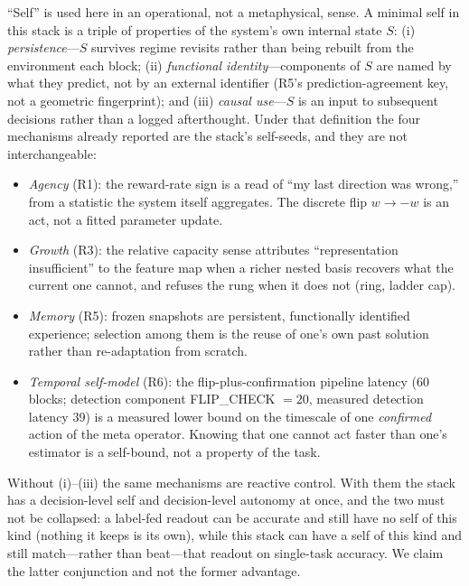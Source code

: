 \documentclass[preprint,12pt]{elsarticle}
\begin{document}
``Self'' is used here in an operational, not a metaphysical, sense. A minimal
self in this stack is a triple of properties of the system's own internal
state $S$: (i) \emph{persistence}---$S$ survives regime revisits rather than
being rebuilt from the environment each block; (ii) \emph{functional
identity}---components of $S$ are named by what they predict, not by an
external identifier (R5's prediction-agreement key, not a geometric
fingerprint); and (iii) \emph{causal use}---$S$ is an input to subsequent
decisions rather than a logged afterthought. Under that definition the four
mechanisms already reported are the stack's self-seeds, and they are not
interchangeable:

\begin{itemize}[leftmargin=1.4em,itemsep=2pt,topsep=2pt]
\item \emph{Agency} (R1): the reward-rate sign is a read of ``my last
direction was wrong,'' from a statistic the system itself aggregates. The
discrete flip $w\to-w$ is an act, not a fitted parameter update.
\item \emph{Growth} (R3): the relative capacity sense attributes
``representation insufficient'' to the feature map when a richer nested
basis recovers what the current one cannot, and refuses the rung when it
does not (ring, ladder cap).
\item \emph{Memory} (R5): frozen snapshots are persistent, functionally
identified experience; selection among them is the reuse of one's own past
solution rather than re-adaptation from scratch.
\item \emph{Temporal self-model} (R6): the flip-plus-confirmation pipeline
latency ($60$ blocks; detection component FLIP\_CHECK $=20$, measured
detection latency $39$) is a measured lower bound on the timescale of one
\emph{confirmed} action of the meta operator. Knowing that one cannot act
faster than one's estimator is a
self-bound, not a property of the task.
\end{itemize}

Without (i)--(iii) the same mechanisms are reactive control. With them the
stack has a decision-level self and decision-level autonomy at once, and the
two must not be collapsed: a label-fed readout can be accurate and still have
no self of this kind (nothing it keeps is its own), while this stack can have
a self of this kind and still match---rather than beat---that readout on
single-task accuracy. We claim the latter conjunction and not the former
advantage.
\end{document}
